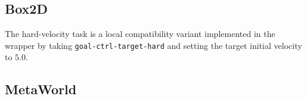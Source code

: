 \subsection{Box2D}




The hard-velocity task is a local compatibility variant implemented in the
wrapper by taking \texttt{goal-ctrl-target-hard} and setting the target initial
velocity to $5.0$.

\subsection{MetaWorld}

